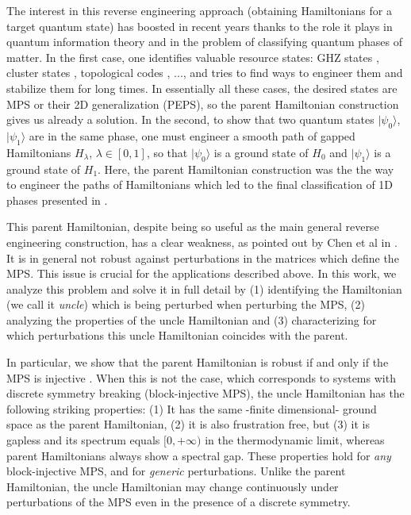 \documentclass[cmp]{svjour}
\newcommand{\ket}[1]{|#1\rangle}
\begin{document}
The interest in this reverse engineering approach (obtaining Hamiltonians for a target quantum state) has boosted in recent years thanks to the role it plays in quantum information theory and in the problem of classifying quantum phases of matter. In the first case, one identifies valuable resource states: GHZ states \cite{GHZ}, cluster states \cite{1Dcluster}, topological codes \cite{kitaev:toriccode}, ..., and tries to find ways to engineer them and stabilize them for long times. In essentially all these cases, the desired states are MPS or their 2D generalization (PEPS), so the parent Hamiltonian construction  \cite{fannes:FCS} gives us already a solution. In the second, to show that two quantum states $\ket{\psi_0}$, $\ket{\psi_1}$ are in the same phase, one must engineer a smooth path of gapped Hamiltonians $H_\lambda$, $\lambda\in [0,1]$, so that $\ket{\psi_0}$ is a ground state of $H_0$ and $\ket{\psi_1}$ is a ground state of $H_1$. Here, the parent Hamiltonian construction was the the way to engineer the paths of Hamiltonians which led to the final classification of 1D phases presented in \cite{chen:classification,kitaev:classification,pollmann,schuch:phaseclassification}.

This parent Hamiltonian, despite being so useful as the main general reverse engineering construction, has a clear weakness, as pointed out by Chen et al in \cite{chen:parentH-robustness}. It is in general not robust against perturbations in the matrices which define the MPS. This issue is crucial for the applications described above. In this work, we analyze this problem and solve it in full detail by (1) identifying the Hamiltonian (we call it {\it uncle}) which is being perturbed when perturbing the MPS, (2) analyzing the properties of the uncle Hamiltonian and (3) characterizing for which perturbations this uncle Hamiltonian coincides with the parent.

In particular, we show that the parent Hamiltonian is robust if and only if the MPS is injective \cite{perez-garcia:mps-reps}. When this is not the case, which corresponds to systems with discrete symmetry breaking \cite{perez-garcia:mps-reps} (block-injective MPS), the uncle Hamiltonian has the following striking properties: (1) It has the same -finite
dimensional- ground space as the parent Hamiltonian, (2) it is also
frustration free, but (3) it is gapless and its spectrum
equals $[0,+\infty)$ in the thermodynamic limit, whereas parent Hamiltonians always show a spectral gap. These properties hold for
\emph{any} block-injective MPS, and for \emph{generic}
perturbations. Unlike the parent Hamiltonian, the uncle Hamiltonian
may change continuously under perturbations of the MPS even in the
presence of a discrete symmetry.
\end{document}

